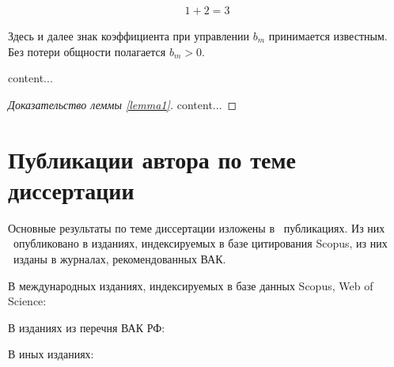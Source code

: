 \begin{align} %
	1+2=3
\end{align}

\begin{assumption-syn-ru}
	Здесь и далее знак коэффициента при управлении $b_m$
	принимается известным. Без потери общности полагается $b_m >0$.
\end{assumption-syn-ru}
\begin{lemma-syn-ru} \label{lemma1}
	content...
\end{lemma-syn-ru}

\begin{proof}[Доказательство леммы \ref{lemma1}]
	content...
\end{proof}

\section*{Публикации автора по теме диссертации}


Основные результаты по теме диссертации изложены в \theAllMyPapers~публикациях. 
Из них \theScopusPapers~опубликовано в изданиях, индексируемых в базе цитирования Scopus, 
из них \theVakPapers~изданы в журналах, рекомендованных ВАК. 
%

В международных изданиях, индексируемых в базе данных Scopus, Web of Science:
\printPapperScopus

В изданиях из перечня ВАК РФ:

В иных изданиях:
\printPapperOther

